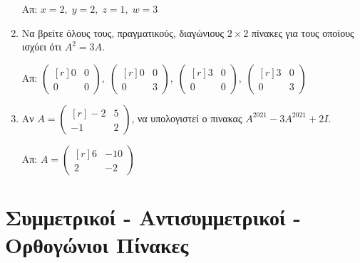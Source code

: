\documentclass[a4paper,table]{report}
\begin{document}
\begin{enumerate}
  \hfill Απ: $ x=2, \; y=2, \; z=1, \; w=3 $ 

\item Να βρείτε όλους τους, πραγματικούς, διαγώνιους $ 2 \times 2 $ πίνακες για τους 
  οποίους ισχύει ότι $ A^{2}=3A $.

  \hfill Απ: $\scriptstyle{ 
  \begin{pmatrix*}[r]
    0 & 0 \\
    0 &0
  \end{pmatrix*}, \; 
  \begin{pmatrix*}[r]
    0 & 0 \\
    0 & 3
  \end{pmatrix*}, \; 
  \begin{pmatrix*}[r]
    3 & 0 \\
    0 & 0
  \end{pmatrix*}, \; 
  \begin{pmatrix*}[r]
    3 & 0 \\
    0 & 3
\end{pmatrix*}} $
  

\item Αν $ A = 
  \begin{pmatrix*}[r]
    -2 & 5 \\
    -1 & 2
  \end{pmatrix*} $, να υπολογιστεί ο πινακας $ A^{2021} - 3A^{2021} +2I $. 

  \hfill Απ: $ A = 
  \begin{pmatrix*}[r]
    6 & -10 \\
    2 & -2
  \end{pmatrix*} $ 
\end{enumerate}

\section*{Συμμετρικοί - Αντισυμμετρικοί - Ορθογώνιοι Πίνακες}
\end{document}
